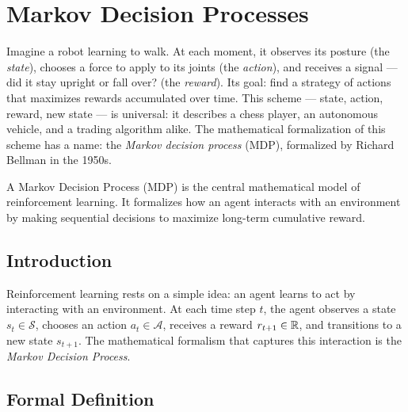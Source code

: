 \chapter{Markov Decision Processes}
\label{ch:mdp}

Imagine a robot learning to walk. At each moment, it observes its posture
(the \emph{state}), chooses a force to apply to its joints (the
\emph{action}), and receives a signal --- did it stay upright or fall over?
(the \emph{reward}). Its goal: find a strategy of actions that maximizes
rewards accumulated over time. This scheme --- state, action, reward, new
state --- is universal: it describes a chess player, an autonomous vehicle,
and a trading algorithm alike. The mathematical formalization of this scheme
has a name: the \emph{Markov decision process} (MDP), formalized by Richard
Bellman in the 1950s.

\begin{intuition}
A Markov Decision Process (MDP) is the central mathematical model of
reinforcement learning. It formalizes how an agent interacts with an
environment by making sequential decisions to maximize long-term cumulative
reward.
\end{intuition}

\section{Introduction}

Reinforcement learning rests on a simple idea: an agent learns to act by
interacting with an environment. At each time step $t$, the agent observes a
state $s_t \in \mathcal{S}$, chooses an action $a_t \in \mathcal{A}$, receives
a reward $r_{t+1} \in \mathbb{R}$, and transitions to a new state $s_{t+1}$. The
mathematical formalism that captures this interaction is the
\emph{Markov Decision Process}.

\section{Formal Definition}

